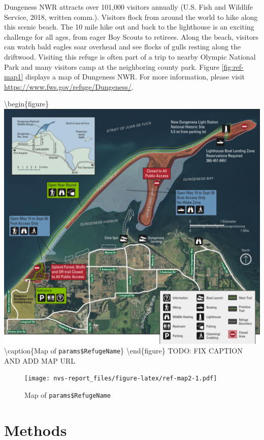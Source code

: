 \documentclass[]{book}
\begin{document}
Dungeness NWR attracts over 101,000 visitors annually (U.S. Fish and
Wildlife Service, 2018, written comm.). Visitors flock from around the
world to hike along this scenic beach. The 10 mile hike out and back to
the lighthouse is an exciting challenge for all ages, from eager Boy
Scouts to retirees. Along the beach, visitors can watch bald eagles soar
overhead and see flocks of gulls resting along the driftwood. Visiting
this refuge is often part of a trip to nearby Olympic National Park and
many visitors camp at the neighboring county park. Figure
\ref{fig:ref-map1} displays a map of Dungeness NWR. For more
information, please visit \url{https://www.fws.gov/refuge/Dungeness/}.

\textbackslash{}begin\{figure\}
\includegraphics[width=19.29in]{refuge-info/Dungeness National Wildlife Refuge/map}
\textbackslash{}caption\{Map of
\texttt{params\$RefugeName}\}\label{fig:ref-map1}
\textbackslash{}end\{figure\} TODO: FIX CAPTION AND ADD MAP URL

\begin{figure}
\centering
\texttt{[image: nvs-report\_files/figure-latex/ref-map2-1.pdf]}
\caption{\label{fig:ref-map2}Map of \texttt{params\$RefugeName}}
\end{figure}

\chapter{Methods}\label{methods}
\end{document}
